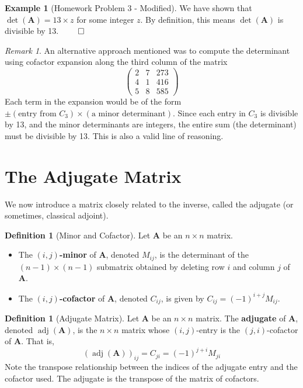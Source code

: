 \documentclass[11pt]{article}
\theoremstyle{definition}
\newtheorem{definition}[theorem]{Definition}
\newtheorem{example}[theorem]{Example}
\theoremstyle{remark}
\newtheorem{remark}[theorem]{Remark}
\DeclareMathOperator{\adj}{adj}
\DeclareMathOperator{\det}{det}
\newcommand{\mat}[1]{\mathbf{#1}} %
\begin{document}
\begin{example}[Homework Problem 3 - Modified]
We have shown that $\det(\mat{A}) = 13 \times z$ for some integer $z$. By definition, this means $\det(\mat{A})$ is divisible by 13. $\qed$

\begin{remark}
An alternative approach mentioned was to compute the determinant using cofactor expansion along the third column of the matrix
\[ \begin{pmatrix} 2 & 7 & 273 \\ 4 & 1 & 416 \\ 5 & 8 & 585 \end{pmatrix} \]
Each term in the expansion would be of the form $\pm (\text{entry from } C_3) \times (\text{a minor determinant})$. Since each entry in $C_3$ is divisible by 13, and the minor determinants are integers, the entire sum (the determinant) must be divisible by 13. This is also a valid line of reasoning.
\end{remark}
\end{example}

\section{The Adjugate Matrix}

We now introduce a matrix closely related to the inverse, called the adjugate (or sometimes, classical adjoint).

\begin{definition}[Minor and Cofactor]
Let $\mat{A}$ be an $n \times n$ matrix.
\begin{itemize}
    \item The \textbf{$(i,j)$-minor} of $\mat{A}$, denoted $M_{ij}$, is the determinant of the $(n-1) \times (n-1)$ submatrix obtained by deleting row $i$ and column $j$ of $\mat{A}$.
    \item The \textbf{$(i,j)$-cofactor} of $\mat{A}$, denoted $C_{ij}$, is given by $C_{ij} = (-1)^{i+j} M_{ij}$.
\end{itemize}
\end{definition}

\begin{definition}[Adjugate Matrix]
Let $\mat{A}$ be an $n \times n$ matrix. The \textbf{adjugate} of $\mat{A}$, denoted $\adj(\mat{A})$, is the $n \times n$ matrix whose $(i,j)$-entry is the $(j,i)$-cofactor of $\mat{A}$. That is,
\[ (\adj(\mat{A}))_{ij} = C_{ji} = (-1)^{j+i} M_{ji} \]
Note the transpose relationship between the indices of the adjugate entry and the cofactor used. The adjugate is the transpose of the matrix of cofactors.
\end{definition}
\end{document}
